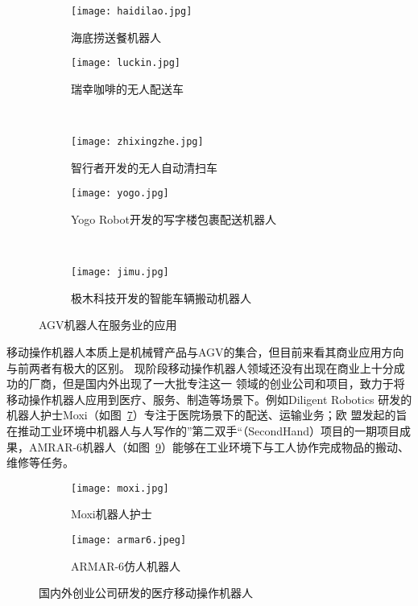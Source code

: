 \begin{figure}
\centering
\begin{subfigure}{.5\textwidth}
  \centering
  \texttt{[image: haidilao.jpg]}
  \caption{海底捞送餐机器人}
  \label{fig:haidilao}
\end{subfigure}%
\begin{subfigure}{.5\textwidth}
  \centering
  \texttt{[image: luckin.jpg]}
  \caption{瑞幸咖啡的无人配送车}
  \label{fig:luckin}
\end{subfigure}%
\\
\begin{subfigure}{.5\textwidth}
  \centering
  \texttt{[image: zhixingzhe.jpg]}
  \caption{智行者开发的无人自动清扫车}
  \label{fig:zhixingzhe}
\end{subfigure}%
\begin{subfigure}{.5\textwidth}
  \centering
  \texttt{[image: yogo.jpg]}
  \caption{Yogo Robot开发的写字楼包裹配送机器人}
  \label{fig:yogo}
\end{subfigure}%
\\
\begin{subfigure}{.5\textwidth}
  \centering
  \texttt{[image: jimu.jpg]}
  \caption{极木科技开发的智能车辆搬动机器人}
  \label{fig:jimu}
\end{subfigure}%
\caption{AGV机器人在服务业的应用}
\end{figure}


移动操作机器人本质上是机械臂产品与AGV的集合，但目前来看其商业应用方向与前两者有极大的区别。
现阶段移动操作机器人领域还没有出现在商业上十分成功的厂商，但是国内外出现了一大批专注这一
领域的创业公司和项目，致力于将移动操作机器人应用到医疗、服务、制造等场景下。例如Diligent Robotics
研发的机器人护士Moxi（如图~\ref{fig:moxi}）专注于医院场景下的配送、运输业务；欧
盟发起的旨在推动工业环境中机器人与人写作的”第二双手“（SecondHand）项目的一期项目成
果，AMRAR-6机器人（如图~\ref{fig:armar6}）能够在工业环境下与工人协作完成物品的搬动、维修等任务。

\begin{figure}
\centering
\begin{subfigure}{.5\textwidth}
  \centering
  \texttt{[image: moxi.jpg]}
  \caption{Moxi机器人护士}
  \label{fig:moxi}
\end{subfigure}%
\begin{subfigure}{.5\textwidth}
  \centering
  \texttt{[image: armar6.jpeg]}
  \caption{ARMAR-6仿人机器人}
  \label{fig:armar6}
\end{subfigure}%
\caption{国内外创业公司研发的医疗移动操作机器人}
\end{figure}

